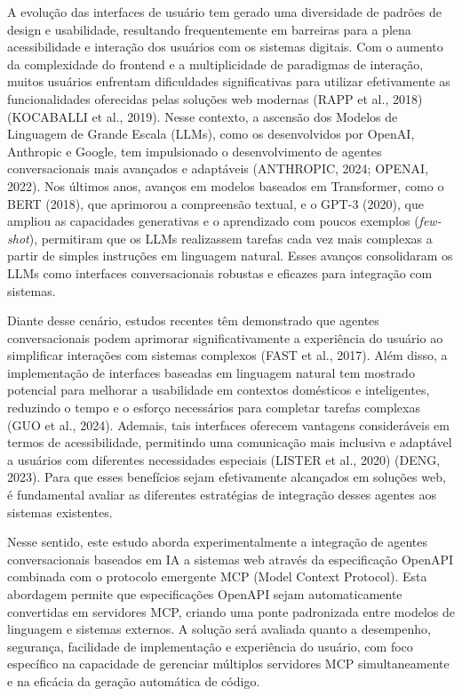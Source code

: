 \documentclass[
]{article}
\begin{document}
A evolução das interfaces de usuário tem gerado uma diversidade de
padrões de design e usabilidade, resultando frequentemente em barreiras
para a plena acessibilidade e interação dos usuários com os sistemas
digitais. Com o aumento da complexidade do frontend e a multiplicidade
de paradigmas de interação, muitos usuários enfrentam dificuldades
significativas para utilizar efetivamente as funcionalidades oferecidas
pelas soluções web modernas (RAPP et al., 2018) (KOCABALLI et al.,
2019). Nesse contexto, a ascensão dos Modelos de Linguagem de Grande
Escala (LLMs), como os desenvolvidos por OpenAI, Anthropic e Google, tem
impulsionado o desenvolvimento de agentes conversacionais mais avançados
e adaptáveis (ANTHROPIC, 2024; OPENAI, 2022). Nos últimos anos, avanços
em modelos baseados em Transformer, como o BERT (2018), que aprimorou a
compreensão textual, e o GPT-3 (2020), que ampliou as capacidades
generativas e o aprendizado com poucos exemplos (\emph{few-shot}),
permitiram que os LLMs realizassem tarefas cada vez mais complexas a
partir de simples instruções em linguagem natural. Esses avanços
consolidaram os LLMs como interfaces conversacionais robustas e eficazes
para integração com sistemas.

Diante desse cenário, estudos recentes têm demonstrado que agentes
conversacionais podem aprimorar significativamente a experiência do
usuário ao simplificar interações com sistemas complexos (FAST et al.,
2017). Além disso, a implementação de interfaces baseadas em linguagem
natural tem mostrado potencial para melhorar a usabilidade em contextos
domésticos e inteligentes, reduzindo o tempo e o esforço necessários
para completar tarefas complexas (GUO et al., 2024). Ademais, tais
interfaces oferecem vantagens consideráveis em termos de acessibilidade,
permitindo uma comunicação mais inclusiva e adaptável a usuários com
diferentes necessidades especiais (LISTER et al., 2020) (DENG, 2023).
Para que esses benefícios sejam efetivamente alcançados em soluções web,
é fundamental avaliar as diferentes estratégias de integração desses
agentes aos sistemas existentes.

Nesse sentido, este estudo aborda experimentalmente a integração de
agentes conversacionais baseados em IA a sistemas web através da
especificação OpenAPI combinada com o protocolo emergente MCP (Model
Context Protocol). Esta abordagem permite que especificações OpenAPI
sejam automaticamente convertidas em servidores MCP, criando uma ponte
padronizada entre modelos de linguagem e sistemas externos. A solução
será avaliada quanto a desempenho, segurança, facilidade de
implementação e experiência do usuário, com foco específico na
capacidade de gerenciar múltiplos servidores MCP simultaneamente e na
eficácia da geração automática de código.
\end{document}
